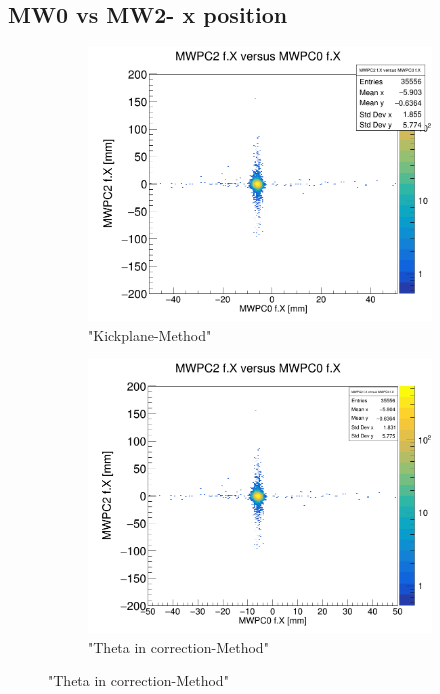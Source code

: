 \documentclass[12pt, letterpaper]{article}
\begin{document}
\subsection{MW0 vs MW2- x position }
\begin{figure}[!htbp]
\begin{subfigure}{.5\textwidth}
  \centering
  \includegraphics[width=.9\linewidth]{plot_imgs/mw2_mw0_get_centr.png}  
  \caption{"Kickplane-Method"}
  \label{fig:sub-first}
\end{subfigure}
\begin{subfigure}{.5\textwidth}
  \centering
  \includegraphics[width=.9\linewidth]{plot_imgs/mw2_mw0_corr.png} 
  \caption{"Theta \textunderscore in correction-Method"}
  \label{fig:sub-second}

\end{subfigure}
\end{figure}
\end{document}

